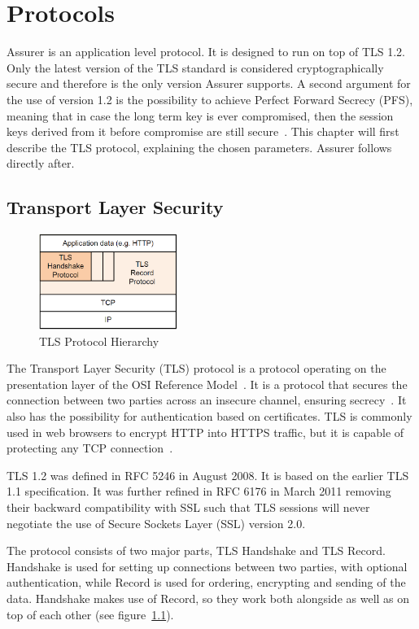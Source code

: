 \chapter{Protocols}
\label{sec:protocols}
Assurer is an application level protocol. It is designed to run on top of TLS 1.2. Only the latest version of the TLS standard is considered cryptographically secure and therefore is the only version Assurer supports. A second argument for the use of version 1.2 is the possibility to achieve Perfect Forward Secrecy (PFS), meaning that in case the long term key is ever compromised, then the session keys derived from it before compromise are still secure~\cite{PFS}. This chapter will first describe the TLS protocol, explaining the chosen parameters. Assurer follows directly after.

\section{Transport Layer Security}
\begin{figure}
  \centering
	\includegraphics[width=0.4\textwidth]{images/tlsstack.png}
	\caption{TLS Protocol Hierarchy}
	\label{fig:tlsstack}
\end{figure}

The Transport Layer Security (TLS) protocol is a protocol operating on the presentation layer of the OSI Reference Model~\cite{osi}. It is a protocol that secures the connection between two parties across an insecure channel, ensuring secrecy~\cite{tls1.2}. It also has the possibility for authentication based on certificates. TLS is commonly used in web browsers to encrypt HTTP into HTTPS traffic, but it is capable of protecting any TCP connection~\cite{lecture}.

TLS 1.2 was defined in RFC 5246 in August 2008. It is based on the earlier TLS 1.1 specification. It was further refined in RFC 6176 in March 2011 removing their backward compatibility with SSL such that TLS sessions will never negotiate the use of Secure Sockets Layer (SSL) version 2.0.

The protocol consists of two major parts, TLS Handshake and TLS Record. Handshake is used for setting up connections between two parties, with optional authentication, while Record is used for ordering, encrypting and sending of the data. Handshake makes use of Record, so they work both alongside as well as on top of each other (see figure~\ref{fig:tlsstack}).



